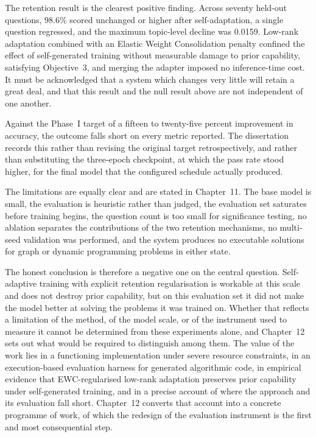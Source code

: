 \documentclass[12pt,a4paper]{report}
\begin{document}
The retention result is the clearest positive finding. Across seventy held-out questions, 98.6\% scored unchanged or higher after self-adaptation, a single question regressed, and the maximum topic-level decline was 0.0159. Low-rank adaptation combined with an Elastic Weight Consolidation penalty confined the effect of self-generated training without measurable damage to prior capability, satisfying Objective~3, and merging the adapter imposed no inference-time cost. It must be acknowledged that a system which changes very little will retain a great deal, and that this result and the null result above are not independent of one another.

Against the Phase~I target of a fifteen to twenty-five percent improvement in accuracy, the outcome falls short on every metric reported. The dissertation records this rather than revising the original target retrospectively, and rather than substituting the three-epoch checkpoint, at which the pass rate stood higher, for the final model that the configured schedule actually produced.

The limitations are equally clear and are stated in Chapter~11. The base model is small, the evaluation is heuristic rather than judged, the evaluation set saturates before training begins, the question count is too small for significance testing, no ablation separates the contributions of the two retention mechanisms, no multi-seed validation was performed, and the system produces no executable solutions for graph or dynamic programming problems in either state.

The honest conclusion is therefore a negative one on the central question. Self-adaptive training with explicit retention regularisation is workable at this scale and does not destroy prior capability, but on this evaluation set it did not make the model better at solving the problems it was trained on. Whether that reflects a limitation of the method, of the model scale, or of the instrument used to measure it cannot be determined from these experiments alone, and Chapter~12 sets out what would be required to distinguish among them. The value of the work lies in a functioning implementation under severe resource constraints, in an execution-based evaluation harness for generated algorithmic code, in empirical evidence that EWC-regularised low-rank adaptation preserves prior capability under self-generated training, and in a precise account of where the approach and its evaluation fall short. Chapter~12 converts that account into a concrete programme of work, of which the redesign of the evaluation instrument is the first and most consequential step.
\end{document}
